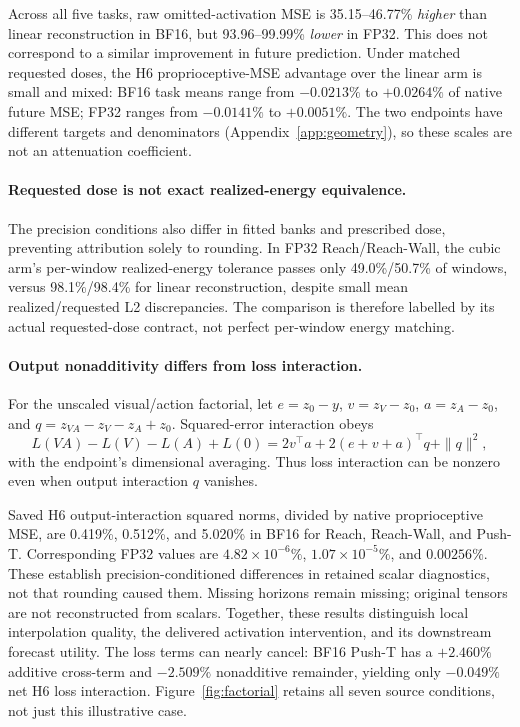 \documentclass{article}
\begin{document}
Across all five tasks, raw omitted-activation MSE is 35.15--46.77\% \emph{higher} than linear reconstruction in BF16, but 93.96--99.99\% \emph{lower} in FP32. This does not correspond to a similar improvement in future prediction. Under matched requested doses, the H6 proprioceptive-MSE advantage over the linear arm is small and mixed: BF16 task means range from \(-0.0213\%\) to \(+0.0264\%\) of native future MSE; FP32 ranges from \(-0.0141\%\) to \(+0.0051\%\). The two endpoints have different targets and denominators (Appendix~\ref{app:geometry}), so these scales are not an attenuation coefficient.

\paragraph{Requested dose is not exact realized-energy equivalence.}
The precision conditions also differ in fitted banks and prescribed dose, preventing attribution solely to rounding. In FP32 Reach/Reach-Wall, the cubic arm's per-window realized-energy tolerance passes only 49.0\%/50.7\% of windows, versus 98.1\%/98.4\% for linear reconstruction, despite small mean realized/requested L2 discrepancies. The comparison is therefore labelled by its actual requested-dose contract, not perfect per-window energy matching.

\paragraph{Output nonadditivity differs from loss interaction.}
For the unscaled visual/action factorial, let \(e=z_0-y\), \(v=z_V-z_0\), \(a=z_A-z_0\), and \(q=z_{VA}-z_V-z_A+z_0\). Squared-error interaction obeys
\begin{equation}
 L(VA)-L(V)-L(A)+L(0)
 =2v^\top a+2(e+v+a)^\top q+\|q\|^2,
 \label{eq:factorial}
\end{equation}
with the endpoint's dimensional averaging. Thus loss interaction can be nonzero even when output interaction \(q\) vanishes.

Saved H6 output-interaction squared norms, divided by native proprioceptive MSE, are 0.419\%, 0.512\%, and 5.020\% in BF16 for Reach, Reach-Wall, and Push-T. Corresponding FP32 values are \(4.82\times10^{-6}\%\), \(1.07\times10^{-5}\%\), and \(0.00256\%\). These establish precision-conditioned differences in retained scalar diagnostics, not that rounding caused them. Missing horizons remain missing; original tensors are not reconstructed from scalars. Together, these results distinguish local interpolation quality, the delivered activation intervention, and its downstream forecast utility.
The loss terms can nearly cancel: BF16 Push-T has a \(+2.460\%\) additive cross-term and \(-2.509\%\) nonadditive remainder, yielding only \(-0.049\%\) net H6 loss interaction. Figure~\ref{fig:factorial} retains all seven source conditions, not just this illustrative case.
\end{document}
